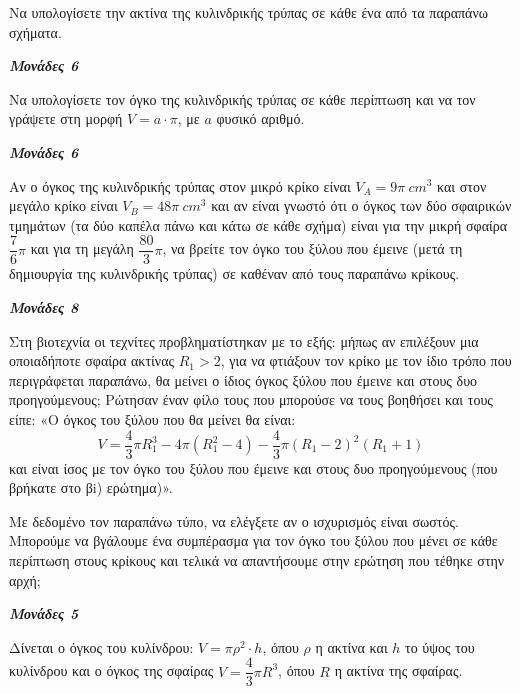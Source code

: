 \documentclass[11pt,a4paper,twoside]{book}
\newcommand{\monades}[1]{
\hspace*{\fill}
\textbf{\textit{\textcolor{maincolor}{Μονάδες #1}}}}
\begin{document}
\begin{alist}
\item

\begin{rlist}
\item Να υπολογίσετε την ακτίνα της κυλινδρικής τρύπας σε κάθε ένα από τα παραπάνω σχήματα.
\monades{6}
\item Να υπολογίσετε τον όγκο της κυλινδρικής τρύπας σε κάθε περίπτωση και να τον γράψετε στη μορφή $V = a \cdot \pi$, με $a$ φυσικό αριθμό.
\monades{6}
\end{rlist}
\item

\begin{rlist}
\item Αν ο όγκος της κυλινδρικής τρύπας στον μικρό κρίκο είναι $V_A = 9\pi\ cm^{3}$ και στον μεγάλο κρίκο είναι $V_B = 48\pi\ cm^{3}$ και αν είναι γνωστό ότι ο όγκος των δύο σφαιρικών τμημάτων (τα δύο καπέλα πάνω και κάτω σε κάθε σχήμα) είναι για την μικρή σφαίρα $\dfrac{7}{6}\pi$ και για τη μεγάλη $\dfrac{80}{3}\pi$, να βρείτε τον όγκο του ξύλου που έμεινε (μετά τη δημιουργία της κυλινδρικής τρύπας) σε καθέναν από τους παραπάνω κρίκους.
\monades{8}
\item Στη βιοτεχνία οι τεχνίτες προβληματίστηκαν με το εξής: μήπως αν επιλέξουν μια οποιαδήποτε σφαίρα ακτίνας $R_1 > 2$, για να φτιάξουν τον κρίκο με τον ίδιο τρόπο που περιγράφεται παραπάνω, θα μείνει ο ίδιος όγκος ξύλου που έμεινε και στους δυο προηγούμενους; Ρώτησαν έναν φίλο τους που μπορούσε να τους βοηθήσει και τους είπε: «Ο όγκος του ξύλου που θα μείνει θα είναι:
\begin{equation*}
V = \dfrac{4}{3}\pi R_1^{3} - 4\pi\left(R_1^{2} - 4\right) - \dfrac{4}{3}\pi\left(R_1 - 2\right)^{2}\left(R_1 + 1\right)
\end{equation*}
και είναι ίσος με τον όγκο του ξύλου που έμεινε και στους δυο προηγούμενους (που βρήκατε στο βi) ερώτημα)».

Με δεδομένο τον παραπάνω τύπο, να ελέγξετε αν ο ισχυρισμός είναι σωστός. Μπορούμε να βγάλουμε ένα συμπέρασμα για τον όγκο του ξύλου που μένει σε κάθε περίπτωση στους κρίκους και τελικά να απαντήσουμε στην ερώτηση που τέθηκε στην αρχή;

\monades{5}

Δίνεται ο όγκος του κυλίνδρου: $V = \pi\rho^{2} \cdot h$, όπου $\rho$ η ακτίνα και $h$ το ύψος του κυλίνδρου και ο όγκος της σφαίρας $V = \dfrac{4}{3}\pi R^{3}$, όπου $R$ η ακτίνα της σφαίρας.
\end{rlist}
\end{alist}
\end{document}
